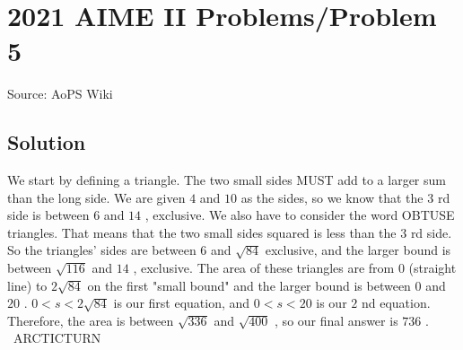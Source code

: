 \documentclass[12pt]{article}
\begin{document}
\section*{{2021 AIME II Problems/Problem 5}}
Source: AoPS Wiki

\subsection*{Solution}
We start by defining a triangle. The two small sides MUST add to a larger sum than the long side. We are given $4$ and $10$ as the sides, so we know that the $3$ rd side is between $6$ and $14$ , exclusive. We also have to consider the word OBTUSE triangles. That means that the two small sides squared is less than the $3$ rd side. So the triangles' sides are between $6$ and $\sqrt{84}$ exclusive, and the larger bound is between $\sqrt{116}$ and $14$ , exclusive. The area of these triangles are from $0$ (straight line) to $2\sqrt{84}$ on the first "small bound" and the larger bound is between $0$ and $20$ . $0 < s < 2\sqrt{84}$ is our first equation, and $0 < s < 20$ is our $2$ nd equation. Therefore, the area is between $\sqrt{336}$ and $\sqrt{400}$ , so our final answer is $\boxed{736}$ . ~ARCTICTURN
\end{document}
